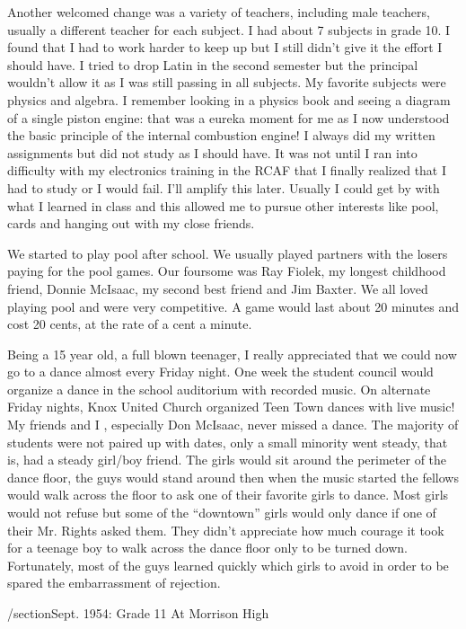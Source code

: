Another welcomed change was a variety of teachers, including male teachers, usually a different teacher for each subject. I had about 7 subjects in grade 10. I found that I had to work harder to keep up but I still didn't give it the effort I should have. I tried to drop Latin in the second semester but the principal wouldn't allow it as I was still passing in all subjects. My favorite subjects were physics and algebra. I remember looking in a physics book and seeing a diagram of a single piston engine: that was a eureka moment for me as I now understood the basic principle of the internal combustion engine! I always did my written assignments but did not study as I should have. It was not until I ran into difficulty with my electronics training in the RCAF that I finally realized that I had to study or I would fail. I'll amplify this later. Usually I could get by with what I learned in class and this allowed me to pursue other interests like pool, cards and hanging out with my close friends.

We started to play pool after school. We usually played partners with the losers paying for the pool games. Our foursome was Ray Fiolek, my longest childhood friend, Donnie McIsaac, my second best friend and Jim Baxter. We all loved playing pool and were very competitive. A game would last about 20 minutes and cost 20 cents, at the rate of a cent a minute.

Being a 15 year old, a full blown teenager, I really appreciated that we could now go to a dance almost every Friday night. One week the student council would organize a dance in the school auditorium with recorded music. On alternate Friday nights, Knox United Church organized Teen Town dances with live music! My friends and I , especially Don McIsaac, never missed a dance. The majority of students were not paired up with dates, only a small minority went steady, that is, had a steady girl/boy friend. The girls would sit around the perimeter of the dance floor, the guys would stand around then when the music started the fellows would walk across the floor to ask one of their favorite girls to dance. Most girls would not refuse but some of the “downtown” girls would only dance if one of their Mr. Rights asked them. They didn't appreciate how much courage it took for a teenage boy to walk across the dance floor only to be turned down. Fortunately, most of the guys learned quickly which girls to avoid in order to be spared the embarrassment of rejection.

/section{Sept. 1954: Grade 11 At Morrison High}

